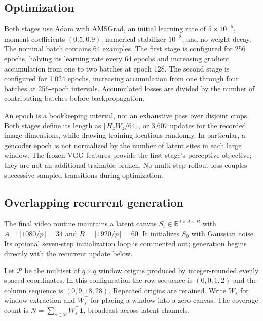 \subsection{Optimization}

Both stages use Adam with AMSGrad, an initial learning rate of $5\times10^{-5}$, moment coefficients $(0.5,0.9)$, numerical stabilizer $10^{-8}$, and no weight decay. The nominal batch contains 64 examples. The first stage is configured for 256 epochs, halving its learning rate every 64 epochs and increasing gradient accumulation from one to two batches at epoch 128. The second stage is configured for 1,024 epochs, increasing accumulation from one through four batches at 256-epoch intervals. Accumulated losses are divided by the number of contributing batches before backpropagation.

An epoch is a bookkeeping interval, not an exhaustive pass over disjoint crops. Both stages define its length as $\lfloor H_zW_z/64\rfloor$, or 3,607 updates for the recorded image dimensions, while drawing training locations randomly. In particular, a gencoder epoch is not normalized by the number of latent sites in each large window. The frozen VGG features provide the first stage's perceptive objective; they are not an additional trainable branch. No multi-step rollout loss couples successive sampled transitions during optimization.

\subsection{Overlapping recurrent generation}

The final video routine maintains a latent canvas $S_t\in\mathbb{R}^{d\times A\times B}$ with $A=\lceil1080/p\rceil=34$ and $B=\lceil1920/p\rceil=60$. It initializes $S_0$ with Gaussian noise. Its optional seven-step initialization loop is commented out; generation begins directly with the recurrent update below.

Let $\mathcal{P}$ be the multiset of $q\times q$ window origins produced by integer-rounded evenly spaced coordinates. In this configuration the row sequence is $(0,0,1,2)$ and the column sequence is $(0,9,18,28)$. Repeated origins are retained. Write $W_s$ for window extraction and $W_s^\top$ for placing a window into a zero canvas. The coverage count is $N=\sum_{s\in\mathcal{P}}W_s^\top\mathbf{1}$, broadcast across latent channels.

